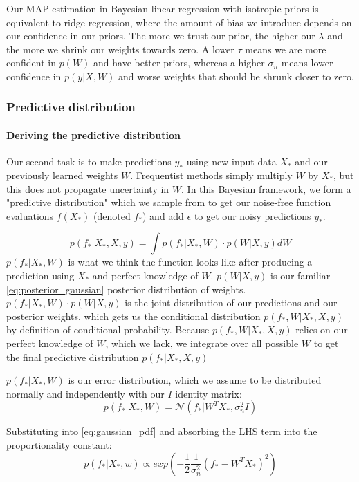 Our MAP estimation in Bayesian linear regression with isotropic priors is equivalent to ridge regression, where the amount of bias we introduce depends on our confidence in our priors. The more we trust our prior, the higher our $\lambda$ and the more we shrink our weights towards zero. A lower $\tau$ means we are more confident in $p(W)$ and have better priors, whereas a higher $\sigma_n$ means lower confidence in $p(y|X,W)$ and worse weights that should be shrunk closer to zero.
        
\subsubsection{Predictive distribution}
\paragraph{Deriving the predictive distribution}
Our second task is to make predictions $y_*$ using new input data $X_*$ and our previously learned weights $W$. Frequentist methods simply multiply $\hat{W}$ by $X_*$, but this does not propagate uncertainty in $W$. In this Bayesian framework, we form a "predictive distribution" which we sample from to get our noise-free function evaluations $f(X_*)$ (denoted $f_*$) and add $\epsilon$ to get our noisy predictions $y_*$.

\begin{equation*}
    p(f_*|X_*,X,y) = \int p(f_*|X_*,W) \cdot p(W | X,y)dW
\end{equation*}
$p(f_*|X_*,W)$ is what we think the function looks like after producing a prediction using $X_*$ and perfect knowledge of $W$. $p(W|X,y)$ is our familiar \ref{eq:posterior_gaussian} posterior distribution of weights. $p(f_*|X_*,W) \cdot p(W|X,y)$ is the joint distribution of our predictions and our posterior weights, which gets us the conditional distribution $p(f_*,W|X_*,X,y)$ by definition of conditional probability. Because $p(f_*,W|X_*,X,y)$ relies on our perfect knowledge of $W$, which we lack, we integrate over all possible $W$ to get the final predictive distribution $p(f_*|X_*,X,y)$
    
$p(f_*|X_*,W)$ is our error distribution, which we assume to be distributed normally and independently with our $I$ identity matrix:
\begin{equation*}
    p(f_* | X_*, W) = \mathcal{N}(f_* | W^TX_*, \sigma^2_nI)
\end{equation*}

Substituting into \ref{eq:gaussian_pdf} and absorbing the LHS term into the proportionality constant:
\begin{equation*}
    p(f_*|X_*,w) \propto exp\left(-\frac{1}{2}\frac{1}{\sigma^2_n}(f_* - W^TX_*)^2\right)
\end{equation*}

